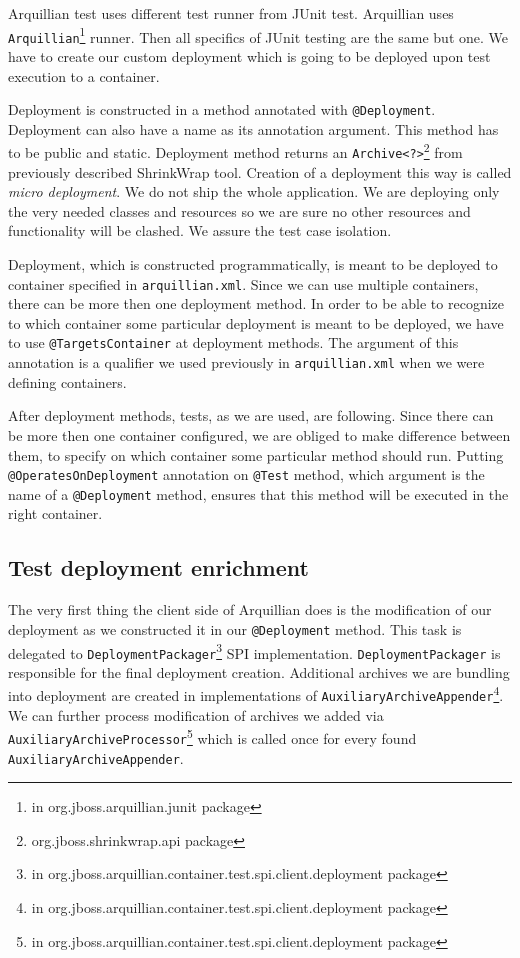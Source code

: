 \documentclass[12pt,final,oneside]{fithesis}
\begin{document}
Arquillian test uses different test runner from JUnit test. Arquillian uses \texttt{Arquillian}\footnote{in org.jboss.arquillian.junit package} runner. Then all specifics of JUnit testing are the same but one. We have to create our custom deployment which is going to be deployed upon test execution to a container.

	

Deployment is constructed in a method annotated with \texttt{@Deployment}. Deployment can also have a name as its annotation argument. This method has to be public and static. Deployment method returns an \texttt{Archive<?>}\footnote{org.jboss.shrinkwrap.api package} from previously described ShrinkWrap tool. Creation of a deployment this way is called \textit{micro deployment}. We do not ship the whole application. We are deploying only the very needed classes and resources so we are sure no other resources and functionality will be clashed. We assure the test case isolation.

Deployment, which is constructed programmatically, is meant to be deployed to container specified in \texttt{arquillian.xml}. Since we can use multiple containers, there can be more then one deployment method. In order to be able to recognize to which container some particular deployment is meant to be deployed, we have to use \texttt{@TargetsContainer} at deployment methods. The argument of this annotation is a qualifier we used previously in \texttt{arquillian.xml} when we were defining containers.

After deployment methods, tests, as we are used, are following. Since there can be more then one container configured, we are obliged to make difference between them, to specify on which container some particular method should run. Putting \texttt{@OperatesOnDeployment} annotation on \texttt{@Test} method, which argument is the name of a \texttt{@Deployment} method, ensures that this method will be executed in the right container.
		
		\subsection{Test deployment enrichment}

The very first thing the client side of Arquillian does is the modification of our deployment as we constructed it in our \texttt{@Deployment} method. This task is delegated to \texttt{DeploymentPackager}\footnote{in org.jboss.arquillian.container.test.spi.client.deployment package} SPI implementation. \texttt{DeploymentPackager} is responsible for the final deployment creation. Additional archives we are bundling into deployment are created in implementations of \texttt{AuxiliaryArchiveAppender}\footnote{in org.jboss.arquillian.container.test.spi.client.deployment package}. We can further process modification of archives we added via \texttt{AuxiliaryArchiveProcessor}\footnote{in org.jboss.arquillian.container.test.spi.client.deployment package} which is called once for every found \texttt{AuxiliaryArchiveAppender}.
\end{document}
